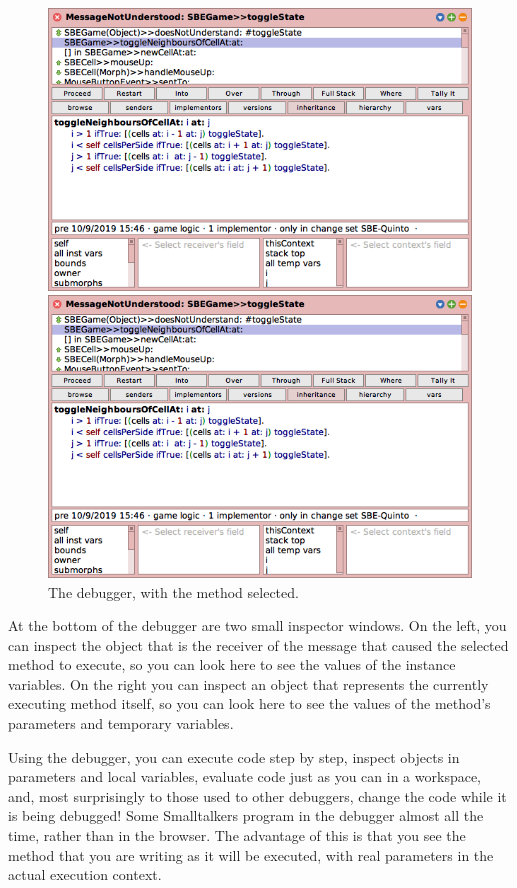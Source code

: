\documentclass[a4paper,10pt,twoside]{book}
\begin{document}
\begin{figure}[ht]
\ifluluelse
	{\centerline {\includegraphics[width=\textwidth]{Debugger}}}
	{\centerline {\includegraphics[scale=0.7]{Debugger}}}
\caption{The debugger, with the method   selected.
\label{fig:debugToggle}}
\end{figure}

At the bottom of the debugger are two small inspector windows.  On the left, you can inspect the object that is the receiver of the message that caused the selected method to execute, so you can look here to see the values of the instance variables.
On the right you can inspect an object that represents the currently executing method itself, so you can look here to see the values of the method's parameters and temporary variables.

Using the debugger, you can execute code step by step, inspect objects in parameters and local variables, evaluate code just as you can in a workspace, and, most surprisingly to those used to other debuggers, change the code while it is being debugged! Some Smalltalkers program in the debugger almost all the time, rather than in the browser.  The advantage of this is that you see the method that you are writing as it will be executed, with real parameters in the actual execution context.
\end{document}
